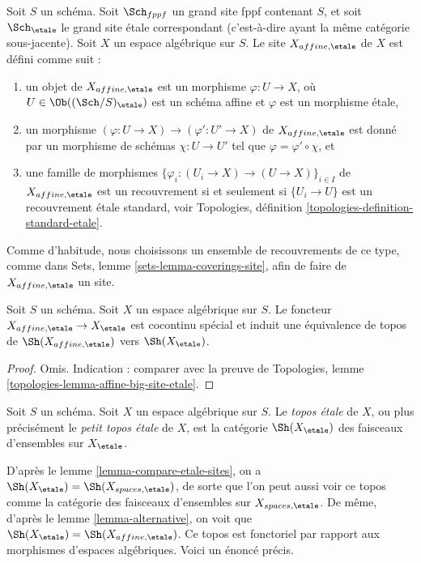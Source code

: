 \begin{definition}
\label{definition-affine-etale-site}
Soit $S$ un schéma.
Soit $\Sch_{fppf}$ un grand site fppf contenant $S$,
et soit $\Sch_\etale$ le grand site \'etale correspondant
(c'est-à-dire ayant la même catégorie sous-jacente).
Soit $X$ un espace algébrique sur $S$.
Le site {\it $X_{affine, \etale}$} de $X$ est défini comme suit :
\begin{enumerate}
\item un objet de $X_{affine, \etale}$ est un morphisme
$\varphi : U \to X$, où $U \in \Ob((\Sch/S)_\etale)$ est un schéma affine et
$\varphi$ est un morphisme \'etale,
\item un morphisme $(\varphi : U \to X) \to (\varphi' : U' \to X)$ de
$X_{affine, \etale}$ est donné par un morphisme de schémas
$\chi : U \to U'$ tel que $\varphi = \varphi' \circ \chi$, et
\item une famille de morphismes
$\{\varphi_i : (U_i \to X) \to (U \to X)\}_{i \in I}$
de $X_{affine, \etale}$ est un recouvrement si et seulement si
$\{U_i \to U\}$ est un recouvrement \'etale standard, voir
Topologies, définition \ref{topologies-definition-standard-etale}.
\end{enumerate}
Comme d'habitude, nous choisissons un ensemble de recouvrements de ce type, comme dans
Sets, lemme \ref{sets-lemma-coverings-site},
afin de faire de $X_{affine, \etale}$ un site.
\end{definition}

\begin{lemma}
\label{lemma-alternative}
Soit $S$ un schéma. Soit $X$ un espace algébrique sur $S$.
Le foncteur $X_{affine, \etale} \to X_\etale$
est cocontinu spécial et induit une équivalence de topos de
$\Sh(X_{affine, \etale})$ vers $\Sh(X_\etale)$.
\end{lemma}

\begin{proof}
Omis. Indication : comparer avec la preuve de
Topologies, lemme \ref{topologies-lemma-affine-big-site-etale}.
\end{proof}

\begin{definition}
\label{definition-etale-topos}
Soit $S$ un schéma. Soit $X$ un espace algébrique sur $S$.
Le {\it topos \'etale} de $X$, ou plus précisément le
{\it petit topos \'etale} de $X$, est la catégorie
$\Sh(X_\etale)$
des faisceaux d'ensembles sur $X_\etale$.
\end{definition}

\noindent
D'après le
lemme \ref{lemma-compare-etale-sites},
on a
$\Sh(X_\etale) = \Sh(X_{spaces, \etale})$,
de sorte que l'on peut aussi voir ce topos comme la catégorie des faisceaux d'ensembles sur
$X_{spaces, \etale}$. De même, d'après le
lemme \ref{lemma-alternative},
on voit que
$\Sh(X_\etale) = \Sh(X_{affine, \etale})$.
Ce topos est fonctoriel par rapport aux morphismes
d'espaces algébriques. Voici un énoncé précis.

